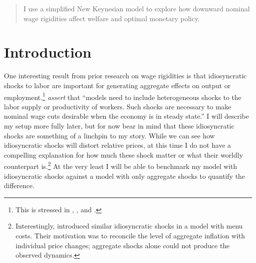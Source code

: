 \documentclass[12pt,a4paper]{scrartcl}            %
\begin{document}




\begin{abstract}
I use a simplified New Keynesian model to explore how downward nominal wage rigidities affect welfare and optimal monetary policy.

\end{abstract}

\section{Introduction}
\label{sec:introduction}

One interesting result from prior research on wage rigidities is that idiosyncratic shocks to labor are important for generating aggregate effects on output or employment.\footnote{
This is stressed in \cite{elsby_2009}, \cite{benigno_ricci_2011}, and \cite{daly_hobijn_2013}.}
\cite{daly_hobijn_2013} \emph{assert} that ``models need to include heterogeneous shocks to the labor supply or productivity of workers. Such shocks are necessary to make nominal wage cuts desirable when the economy is in steady state.''
I will describe my setup more fully later, but for now bear in mind that these idiosyncratic shocks are something of a linchpin to my story.
While we can see how idiosyncratic shocks will distort relative prices, at this time I do not have a compelling explanation for how much these shock matter or what their worldly counterpart is.\footnote{
Interestingly, \cite{golosov_lucas_2007} introduced similar idiosyncratic shocks in a model with menu costs.
Their motivation was to reconcile the level of aggregate inflation with individual price changes;
aggregate shocks alone could not produce the observed dynamics.
}
At the very least I will be able to benchmark my model with idiosyncratic shocks against a model with only aggregate shocks to quantify the difference.

\end{document}
